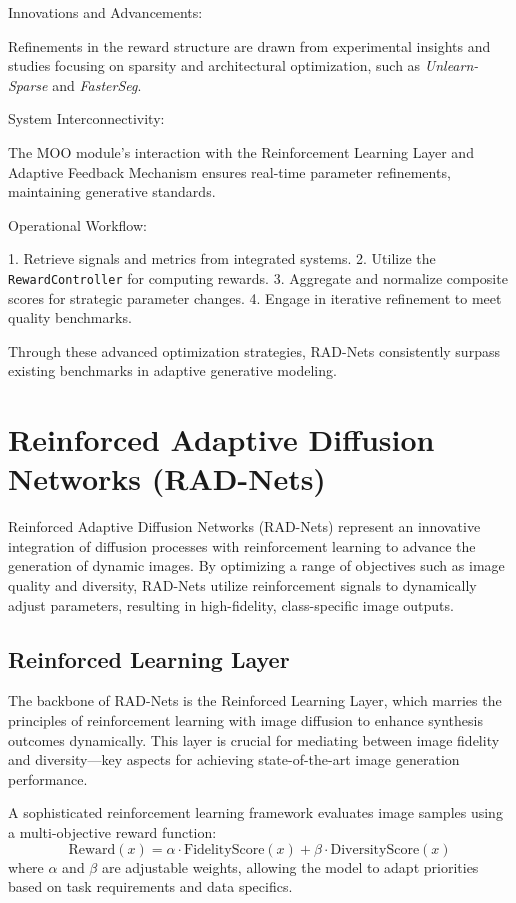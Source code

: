 \documentclass{article} %
\begin{document}
Innovations and Advancements:

Refinements in the reward structure are drawn from experimental insights and studies focusing on sparsity and architectural optimization, such as \textit{Unlearn-Sparse} and \textit{FasterSeg}.

System Interconnectivity:

The MOO module's interaction with the Reinforcement Learning Layer and Adaptive Feedback Mechanism ensures real-time parameter refinements, maintaining generative standards.

Operational Workflow:

1. Retrieve signals and metrics from integrated systems.
2. Utilize the \texttt{RewardController} for computing rewards.
3. Aggregate and normalize composite scores for strategic parameter changes.
4. Engage in iterative refinement to meet quality benchmarks.

Through these advanced optimization strategies, RAD-Nets consistently surpass existing benchmarks in adaptive generative modeling.



\section{Reinforced Adaptive Diffusion Networks (RAD-Nets)}

Reinforced Adaptive Diffusion Networks (RAD-Nets) represent an innovative integration of diffusion processes with reinforcement learning to advance the generation of dynamic images. By optimizing a range of objectives such as image quality and diversity, RAD-Nets utilize reinforcement signals to dynamically adjust parameters, resulting in high-fidelity, class-specific image outputs.

\subsection{Reinforced Learning Layer}

The backbone of RAD-Nets is the Reinforced Learning Layer, which marries the principles of reinforcement learning with image diffusion to enhance synthesis outcomes dynamically. This layer is crucial for mediating between image fidelity and diversity—key aspects for achieving state-of-the-art image generation performance. 

A sophisticated reinforcement learning framework evaluates image samples using a multi-objective reward function:
\[ 
\text{Reward}(x) = \alpha \cdot \text{FidelityScore}(x) + \beta \cdot \text{DiversityScore}(x) 
\]
where \(\alpha\) and \(\beta\) are adjustable weights, allowing the model to adapt priorities based on task requirements and data specifics. 
\end{document}
